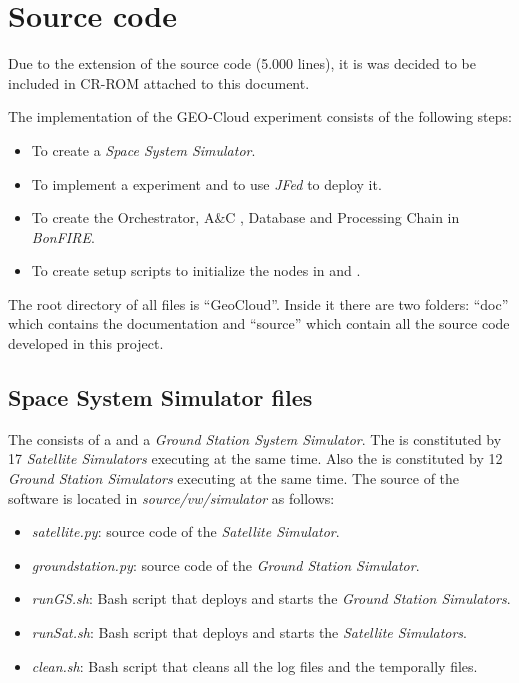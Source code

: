\chapter{Source code}

Due to the extension of the source code (5.000 lines), it is was decided to be included
in CR-ROM attached to this document.

The implementation of the GEO-Cloud experiment consists of the following steps:
\begin{itemize}
\item To create a \emph{Space System Simulator}.
\item To implement a \vw experiment and to use \emph{JFed} to deploy it.
\item To create  the Orchestrator, A\&C , Database and Processing Chain in \emph{BonFIRE}.
\item To create setup scripts to initialize the nodes in \bonfire and \vw.
\end{itemize}

The root directory of all files is ``GeoCloud''. Inside it there are two folders: ``doc'' which contains
the documentation and ``source'' which contain all the source code developed in this
project.

\section{Space System Simulator files}

The \sss consists of a \satss and a \emph{Ground Station System Simulator}. The
\satss is constituted by 17
\emph{Satellite Simulators} executing at the same time. Also the \gsss is
constituted by 12 \emph{Ground Station Simulators} executing at the same time. The source of
the software is located in \emph{source/vw/simulator} as follows:
\begin{itemize}
\item \emph{satellite.py}: source code of the  \emph{Satellite Simulator}.
\item \emph{groundstation.py}: source code of the \emph{Ground Station Simulator}.
\item \emph{runGS.sh}: Bash script that deploys and starts the \emph{Ground Station Simulators}.
\item \emph {runSat.sh}: Bash script that deploys and starts the \emph{Satellite Simulators}.
\item \emph {clean.sh}: Bash script that cleans all the log files and the temporally files.
\end{itemize}

